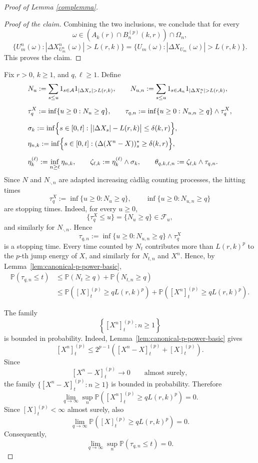 \documentclass[a4paper,10pt]{article}
\renewcommand{\P}{\mathbb P}
\begin{document}
\begin{proof}[Proof of Lemma \ref{complemma}]
\begin{proof}[Proof of the claim]
Combining the two inclusions, we conclude that for every
\[
\omega\in (A_k(r)\cap B_n^{(p)}(k,r))\cap \Omega_{n},
\]
\[
\{U_m^n(\omega): |\Delta X^n_{U_m^n}(\omega)|>L(r,k)\}
=
\{U_m(\omega): |\Delta X_{U_m}(\omega)|>L(r,k)\}.
\]
This proves the claim.
\end{proof}
Fix \(r>0\), \(k\ge1\), and \(q,\ell\ge1\). Define
\[
\begin{aligned}
&N_u
:=
\sum_{s\le u}1_{s\in\mathcal A}1_{|\Delta X_s|>L(r,k)},
\qquad
N_{u,n}
:=
\sum_{s\le u}1_{s\in\mathcal A_n}1_{|\Delta X^n_s|>L(r,k)},\\[0.5em]
%
&\tau_q^X
:=
\inf\{u\ge0:N_u\ge q\},
\qquad
\tau_{q,n}
:=
\inf\{u\ge0:N_{u,n}\ge q\}\wedge \tau_q^X,\\[0.5em]
%
&\sigma_k
:=
\inf\Bigl\{
s\in[0,t]:
\bigl||\Delta X_s|-L(r,k)\bigr|
\le\delta(k,r)
\Bigr\},
\\
&\eta_{n,k}
:=
\inf\Bigl\{
s\in[0,t]:
(\Delta(X^n-X))^*_s
\ge \delta(k,r)
\Bigr\},\\[0.5em]
%
&\eta_k^{(\ell)}
:=
\inf_{n\ge\ell}\eta_{n,k},
\qquad
\zeta_{\ell,k}
:=
\eta_k^{(\ell)}\wedge\sigma_k,
\qquad
\theta_{q,k,\ell,n}
:=
\zeta_{\ell,k}\wedge\tau_{q,n}.
\end{aligned}
\]
Since $N$ and $N_{\cdot,n}$ are adapted increasing càdlàg counting
processes, the hitting times
\[
\tau^X_q:=\inf\{u\ge0:N_u\ge q\},
        \qquad
\inf\{u\ge0:N_{u,n}\ge q\}
\]
are stopping times. Indeed, for every $u\ge0$,
\[
\{\tau^X_q\le u\}=\{N_u\ge q\}\in\mathcal F_u,
\]
and similarly for $N_{\cdot,n}$. Hence
\[
\tau_{q,n}:=\inf\{u\ge0:N_{u,n}\ge q\}\wedge \tau^X_q
\]
is a stopping time.
Every time counted by \(N_t\) contributes more than
\(L(r,k)^p\) to the \(p\)-th jump energy of \(X\), and similarly for
\(N_{t,n}\) and \(X^n\). Hence, by
Lemma~\ref{lem:canonical-p-power-basic},
\[
\begin{aligned}
\P(\tau_{q,n}\le t)
&\le
\P(N_t\ge q)+\P(N_{t,n}\ge q)
\\
&\le
\P\left(
[X]^{(p)}_t\ge qL(r,k)^p
\right)
+
\P\left(
[X^n]^{(p)}_t\ge qL(r,k)^p
\right).
\end{aligned}
\]

The family
\[
        \left\{[X^n]^{(p)}_t:n\ge1\right\}
\]
is bounded in probability. Indeed,
Lemma~\ref{lem:canonical-p-power-basic} gives
\[
[X^n]^{(p)}_t
\le
2^{p-1}
\left(
[X^n-X]^{(p)}_t+[X]^{(p)}_t
\right).
\]
Since
\[
        [X^n-X]^{(p)}_t\longrightarrow0
        \qquad\text{almost surely},
\]
the family
\(
\{[X^n-X]^{(p)}_t:n\ge1\}
\)
is bounded in probability. Therefore
\[
\lim_{q\to\infty}
\sup_n
\P\left(
[X^n]^{(p)}_t\ge qL(r,k)^p
\right)
=
0.
\]
Since \([X]^{(p)}_t<\infty\) almost surely, also
\[
\lim_{q\to\infty}
\P\left(
[X]^{(p)}_t\ge qL(r,k)^p
\right)
=
0.
\]
Consequently,
\[
\lim_{q\to\infty}
\sup_n
\P(\tau_{q,n}\le t)
=
0.
\]


\end{proof}
\end{document}
